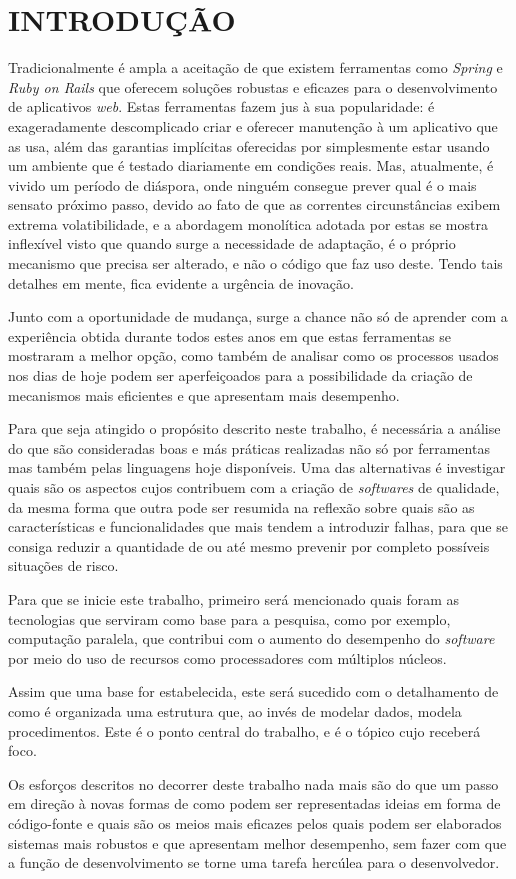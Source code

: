 
\chapter{INTRODUÇÃO}
\label{chap:introducao}

Tradicionalmente é ampla a aceitação de que existem ferramentas como \textit{Spring} e \textit{Ruby on Rails} que oferecem soluções robustas e eficazes para o desenvolvimento de aplicativos \textit{web}. Estas ferramentas fazem jus à sua popularidade: é exageradamente descomplicado criar e oferecer manutenção à um aplicativo que as usa, além das garantias implícitas oferecidas por simplesmente estar usando um ambiente que é testado diariamente em condições reais. Mas, atualmente, é vivido um período de diáspora, onde ninguém consegue prever qual é o mais sensato próximo passo, devido ao fato de que as correntes circunstâncias exibem extrema volatibilidade, e a abordagem monolítica adotada por estas se mostra inflexível visto que quando surge a necessidade de adaptação, é o próprio mecanismo que precisa ser alterado, e não o código que faz uso deste. Tendo tais detalhes em mente, fica evidente a urgência de inovação.
  
Junto com a oportunidade de mudança, surge a chance não só de aprender com a experiência obtida durante todos estes anos em que estas ferramentas se mostraram a melhor opção, como também de analisar como os processos usados nos dias de hoje podem ser aperfeiçoados para a possibilidade da criação de mecanismos mais eficientes e que apresentam mais desempenho.

Para que seja atingido o propósito descrito neste trabalho, é necessária a análise do que são consideradas boas e más práticas realizadas não só por ferramentas mas também pelas linguagens hoje disponíveis. Uma das alternativas é investigar quais são os aspectos cujos contribuem com a criação de \textit{softwares} de qualidade, da mesma forma que outra pode ser resumida na reflexão sobre quais são as características e funcionalidades que mais tendem a introduzir falhas, para que se consiga reduzir a quantidade de ou até mesmo prevenir por completo possíveis situações de risco.

Para que se inicie este trabalho, primeiro será mencionado quais foram as tecnologias que serviram como base para a pesquisa, como por exemplo, computação paralela, que contribui com o aumento do desempenho do \textit{software} por meio do uso de recursos como processadores com múltiplos núcleos.

Assim que uma base for estabelecida, este será sucedido com o detalhamento de como é organizada uma estrutura que, ao invés de modelar dados, modela procedimentos. Este é o ponto central do trabalho, e é o tópico cujo receberá foco.

Os esforços descritos no decorrer deste trabalho nada mais são do que um passo em direção à novas formas de como podem ser representadas ideias em forma de código-fonte e quais são os meios mais eficazes pelos quais podem ser elaborados sistemas mais robustos e que apresentam melhor desempenho, sem fazer com que a função de desenvolvimento se torne uma tarefa hercúlea para o desenvolvedor.
